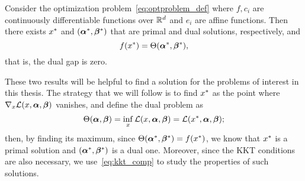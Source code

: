 \begin{theorem}\label{th:strong_duality}
    Consider the optimization problem~\eqref{eq:optproblem_def} where $f, c_i$ are continuously differentiable functions over $\mathbb{R}^d$ and $e_i$ are affine functions. Then there exists ${x}^*$ and $({\bm{\alpha}}^*, {\bm{\beta}}^*)$ that are primal and dual solutions, respectively, and
    $$ f({x}^*) = \Theta({\bm{\alpha}}^*, {\bm{\beta}}^*), $$
    that is, the dual gap is zero.
\end{theorem}
These two results will be helpful to find a solution for the problems of interest in this thesis. The strategy that we will follow is to find ${x}^*$ as the point where $\nabla_x \mathcal{L}(x, \bm{\alpha}, \bm{\beta}) $ vanishes, and define the dual problem as
\begin{equation}
    \nonumber
    \Theta(\bm{\alpha}, \bm{\beta}) = \inf_{x} \mathcal{L}(x, \bm{\alpha}, \bm{\beta}) =  \mathcal{L}({x}^*, \bm{\alpha}, \bm{\beta}) ;
\end{equation}
then, by finding its maximum, since $\Theta({\bm{\alpha}}^*, {\bm{\beta}}^*) = f({x}^*)$, we know that ${x}^*$ is a primal solution and $({\bm{\alpha}}^*, {\bm{\beta}}^*)$ is a dual one. Moreover, since the KKT conditions are also necessary, we use~\eqref{eq:kkt_comp} to study the properties of such solutions.



